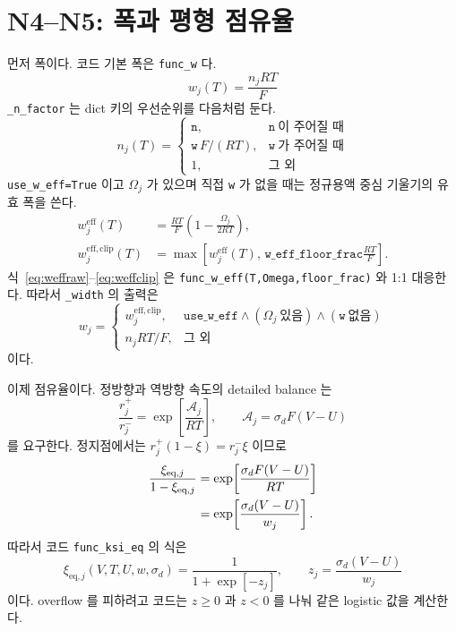 \documentclass[11pt,a4paper]{article}
\newcommand{\eq}{\mathrm{eq}}
\newcommand{\eff}{\mathrm{eff}}
\begin{document}
\section{N4--N5: 폭과 평형 점유율}\label{sec:n4n5}
먼저 폭이다. 코드 기본 폭은 \texttt{func\_w} 다.
\begin{equation}
\boxed{\;w_j(T)=\frac{n_jRT}{F}\;}
\label{eq:w}
\end{equation}
\texttt{\_n\_factor} 는 dict 키의 우선순위를 다음처럼 둔다.
\begin{equation}
n_j(T)=
\begin{cases}
\texttt{n},&\texttt{n}\ \text{이 주어질 때}\\
\texttt{w}\,F/(RT),&\texttt{w}\ \text{가 주어질 때}\\
1,&\text{그 외}
\end{cases}
\label{eq:nfactor}
\end{equation}
\texttt{use\_w\_eff=True} 이고 $\Omega_j$ 가 있으며 직접 \texttt{w} 가 없을 때는 정규용액 중심 기울기의 유효 폭을 쓴다.
\begin{align}
w_j^{\eff}(T)&=\frac{RT}{F}\left(1-\frac{\Omega_j}{2RT}\right),\label{eq:weffraw}\\
w_j^{\eff,\mathrm{clip}}(T)&=\max\left[w_j^{\eff}(T),\,\texttt{w\_eff\_floor\_frac}\frac{RT}{F}\right].
\label{eq:weffclip}
\end{align}
식~\eqref{eq:weffraw}--\eqref{eq:weffclip} 은 \texttt{func\_w\_eff(T,Omega,floor\_frac)} 와 1:1 대응한다.
따라서 \texttt{\_width} 의 출력은
\begin{equation}
w_j=
\begin{cases}
w_j^{\eff,\mathrm{clip}},&
\texttt{use\_w\_eff}\land(\Omega_j\ \text{있음})\land(\texttt{w}\ \text{없음})\\
n_jRT/F,&\text{그 외}
\end{cases}
\label{eq:widthchoice}
\end{equation}
이다.

이제 점유율이다. 정방향과 역방향 속도의 detailed balance 는
\begin{equation}
\frac{r_j^+}{r_j^-}=\exp\!\left[\frac{\mathcal A_j}{RT}\right],
\qquad
\mathcal A_j=\sigma_d F(V-U)
\label{eq:dbv7}
\end{equation}
를 요구한다. 정지점에서는 $r_j^+(1-\xi)=r_j^-\xi$ 이므로
\begin{align}
\frac{\xi_{\eq,j}}{1-\xi_{\eq,j}}
&=\exp\!\left[\frac{\sigma_d F(V-U)}{RT}\right]\notag\\
&=\exp\!\left[\frac{\sigma_d(V-U)}{w_j}\right].
\label{eq:logit}
\end{align}
따라서 코드 \texttt{func\_ksi\_eq} 의 식은
\begin{equation}
\boxed{\;\xi_{\eq,j}(V,T,U,w,\sigma_d)=
\frac{1}{1+\exp[-z_j]},\qquad
z_j=\frac{\sigma_d(V-U)}{w_j}\;}
\label{eq:xieq}
\end{equation}
이다. overflow 를 피하려고 코드는 $z\ge0$ 과 $z<0$ 를 나눠 같은 logistic 값을 계산한다.
\end{document}
